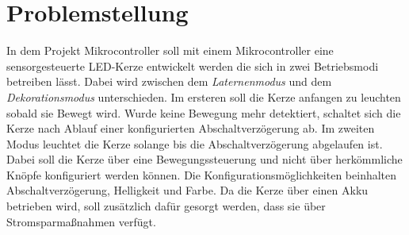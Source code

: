 \part{Problemstellung}
    In dem Projekt Mikrocontroller soll mit einem Mikrocontroller 
    eine sensorgesteuerte LED-Kerze entwickelt werden die sich in zwei
    Betriebsmodi betreiben lässt.
    Dabei wird zwischen dem \textit{Laternenmodus} und dem
    \textit{Dekorationsmodus} unterschieden. Im ersteren soll die Kerze anfangen
    zu leuchten sobald sie Bewegt wird.
    Wurde keine Bewegung mehr detektiert, schaltet sich die Kerze nach Ablauf
    einer konfigurierten Abschaltverzögerung ab.
    Im zweiten Modus leuchtet die Kerze solange bis die Abschaltverzögerung
    abgelaufen ist.\\
    Dabei soll die Kerze über eine Bewegungssteuerung und nicht
    über herkömmliche Knöpfe konfiguriert werden können.
    Die Konfigurationsmöglichkeiten beinhalten Abschaltverzögerung, Helligkeit
    und Farbe. Da die Kerze über einen Akku betrieben wird, soll zusätzlich
    dafür gesorgt werden, dass sie über Stromsparmaßnahmen verfügt.

